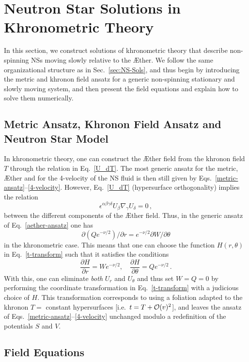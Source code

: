\documentclass[prd,aps,twocolumn,nofootinbib,showpacs,superscriptaddress]{revtex4-1}
\newcommand\be{\begin{equation}}
\newcommand\ee{\end{equation}}
\begin{document}
\section{Neutron Star Solutions in Khronometric Theory}
\label{sec:NS-SolsHL}

In this section, we construct solutions of khronometric theory
that describe non-spinning NSs moving slowly relative to the \AE ther.  
We follow the same organizational structure as in
Sec.~\ref{sec:NS-Sols}, and thus begin by introducing the metric and
khronon field ansatz for a generic non-spinning stationary and slowly moving system,
and then present the field equations and explain how to solve them numerically.

\subsection{Metric Ansatz, Khronon Field Ansatz and Neutron Star Model}

In khronometric theory, one can construct the \AE ther field from the
khronon field $T$ through the relation in Eq.~\eqref{U_dT}.
The most generic ansatz for the metric, \AE ther and for the 4-velocity of the NS
fluid is then still given by Eqs.~\eqref{metric-ansatz}--\eqref{4-velocity}. However, Eq.~\eqref{U_dT} (hypersurface orthogonality) implies the relation
\be \epsilon^{\alpha\beta\gamma\delta} U_{\beta} \nabla_\gamma
U_\delta =0\,,
\ee
%
between the different components of the  \AE ther field. 
Thus, in the generic 
 ansatz of Eq.~\eqref{aether-ansatz} one has  \be
 {\partial  (Q e^{-\nu/2})}/{\partial r} =e^{-\nu/2}
{\partial  W}/{\partial \theta}
\ee
in the khronometric case. 
This means that one can choose the
function $H(r,\theta)$ in Eq.~\eqref{t-transform} such that it
satisfies the conditions
%
\be \frac{\partial H}{\partial r} = We^{-\nu/2}, \quad  \frac{\partial
  H}{\partial \theta} = Qe^{-\nu/2}\,.  \ee
%
With this, one can eliminate \textit{both} $U_r$ and $U_\theta$ and thus set $W=Q=0$ by
performing the coordinate transformation in Eq.~\eqref{t-transform}
with a judicious choice of $H$. This transformation corresponds to using a foliation adapted to
the khronon $T=$ constant hypersurfaces [i.e.~$t=T+{\cal O}(v)^2$], and leaves the ansatz of 
Eqs.~\eqref{metric-ansatz}--\eqref{4-velocity} unchanged modulo a redefinition
of the potentials $S$ and $V$.

\subsection{Field Equations}
\end{document}
